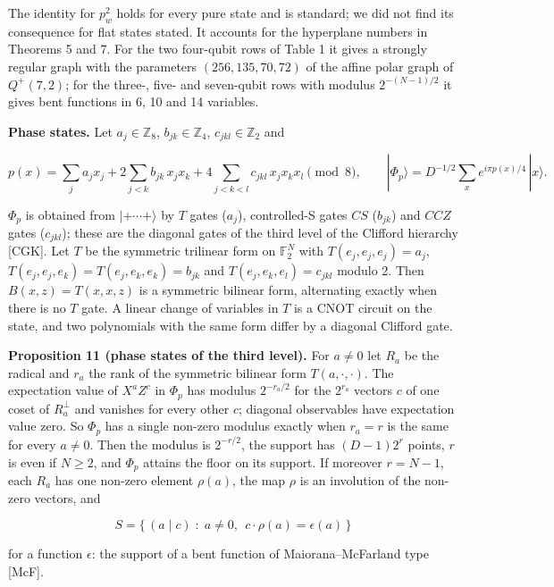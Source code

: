 \documentclass[11pt,a4paper]{article}
\newcommand{\lt}{<}
\begin{document}
The identity for \(p_w^2\) holds for every pure state and is standard; we did not find its consequence for
flat states stated. It accounts for the hyperplane numbers in Theorems 5 and 7. For the two four-qubit
rows of Table 1 it gives a strongly regular graph with the parameters \((256, 135, 70, 72)\) of the affine
polar graph of \(Q^+(7,2)\); for the three-, five- and seven-qubit rows with modulus \(2^{-(N-1)/2}\) it gives
bent functions in 6, 10 and 14 variables.

\textbf{Phase states.} Let \(a_j \in \mathbb{Z}_8\), \(b_{jk} \in \mathbb{Z}_4\), \(c_{jkl} \in \mathbb{Z}_2\) and

\[p(x) = \sum_j a_j x_j + 2\sum_{j \lt k} b_{jk}\, x_j x_k + 4\sum_{j \lt k \lt l} c_{jkl}\, x_j x_k x_l \pmod 8,
\qquad |\Phi_p\rangle = D^{-1/2}\sum_{x} e^{i\pi p(x)/4}\,|x\rangle .\]

\(\Phi_p\) is obtained from \(|{+}\cdots{+}\rangle\) by \(T\) gates (\(a_j\)), controlled-S gates \(CS\) (\(b_{jk}\)) and
\(CCZ\) gates (\(c_{jkl}\)); these are the diagonal gates of the third level of the Clifford hierarchy {[}CGK{]}.
Let \(T\) be the symmetric trilinear form on \(\mathbb{F}_2^N\) with \(T(e_j,e_j,e_j) = a_j\),
\(T(e_j,e_j,e_k) = T(e_j,e_k,e_k) = b_{jk}\) and \(T(e_j,e_k,e_l) = c_{jkl}\) modulo 2. Then
\(B(x,z) = T(x,x,z)\) is a symmetric bilinear form, alternating exactly when there is no \(T\) gate. A linear
change of variables in \(T\) is a CNOT circuit on the state, and two polynomials with the same form differ
by a diagonal Clifford gate.

\textbf{Proposition 11 (phase states of the third level).} For \(a \ne 0\) let \(R_a\) be the radical and \(r_a\)
the rank of the symmetric bilinear form \(T(a,\cdot,\cdot)\). The expectation value of \(X^aZ^c\) in \(\Phi_p\)
has modulus \(2^{-r_a/2}\) for the \(2^{r_a}\) vectors \(c\) of one coset of \(R_a^{\perp}\) and vanishes for every
other \(c\); diagonal observables have expectation value zero. So \(\Phi_p\) has a single non-zero modulus
exactly when \(r_a = r\) is the same for every \(a \ne 0\). Then the modulus is \(2^{-r/2}\), the support has
\((D-1)2^r\) points, \(r\) is even if \(N \ge 2\), and \(\Phi_p\) attains the floor on its support. If moreover
\(r = N-1\), each \(R_a\) has one non-zero element \(\rho(a)\), the map \(\rho\) is an involution of the non-zero
vectors, and

\[S = \{\,(a \mid c) \;:\; a \ne 0,\ \ c\cdot\rho(a) = \epsilon(a)\,\}\]

for a function \(\epsilon\): the support of a bent function of Maiorana--McFarland type {[}McF{]}.
\end{document}
